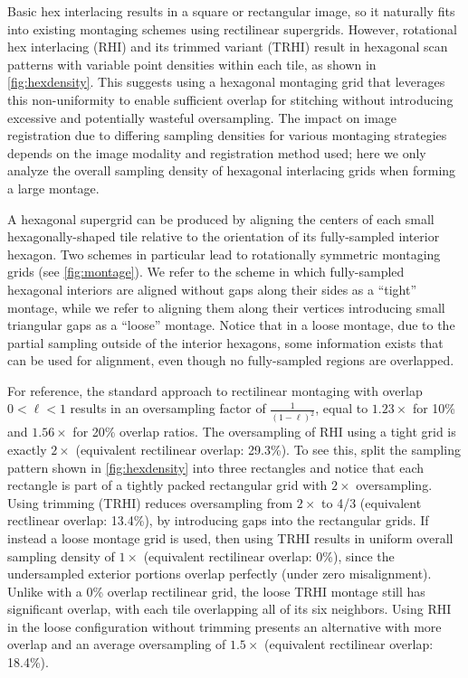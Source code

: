 \documentclass[aip, amsmath, amssymb, nobibnotes, nofootinbib, citeautoscript, reprint, superscriptaddress]{revtex4-1}
\begin{document}
    Basic hex interlacing results in a square or rectangular image, so it naturally
    fits into existing montaging schemes using rectilinear supergrids.
    However, rotational hex interlacing (RHI) and its trimmed variant (TRHI) result in
    hexagonal scan patterns with variable point densities within each tile, as shown
    in \autoref{fig:hexdensity}.
    This suggests using a hexagonal montaging grid that leverages this
    non-uniformity to enable sufficient overlap for stitching without introducing
    excessive and potentially wasteful oversampling.
    The impact on image registration due to differing sampling densities for various
    montaging strategies depends on the image modality and registration method used;
    here we only analyze the overall sampling density of hexagonal interlacing grids
    when forming a large montage.


    A hexagonal supergrid can be produced by aligning the centers of each small
    hexagonally-shaped tile relative to the orientation of its fully-sampled
    interior hexagon.
    Two schemes in particular lead to rotationally symmetric montaging grids (see \autoref{fig:montage}).
    We refer to the scheme in which fully-sampled hexagonal interiors are aligned
    without gaps along their sides as a ``tight'' montage, while we refer to
    aligning them along their vertices introducing small triangular gaps as a
    ``loose'' montage.
    Notice that in a loose montage, due to the partial sampling outside of the
    interior hexagons, some information exists that can be used for alignment, even
    though no fully-sampled regions are overlapped.



    For reference, the standard approach to rectilinear montaging with overlap
    $0<\ell<1$ results in an oversampling factor of $\frac{1}{(1-\ell)^2}$, equal to
    $1.23\times$ for 10\% and $1.56\times$ for 20\% overlap ratios.
    The oversampling of RHI using a tight grid is exactly $2\times$ (equivalent rectilinear
    overlap: 29.3\%).
    To see this, split the sampling pattern shown in \autoref{fig:hexdensity} into three
    rectangles and notice that each rectangle is part of a tightly packed
    rectangular grid with $2\times$ oversampling.
    Using trimming (TRHI) reduces oversampling from $2\times$ to 4/3 (equivalent rectlinear
    overlap: 13.4\%), by introducing gaps into the rectangular grids.
    If instead a loose montage grid is used, then using TRHI results in uniform
    overall sampling density of $1\times$ (equivalent rectilinear overlap: 0\%), since the
    undersampled exterior portions overlap perfectly (under zero misalignment).
    Unlike with a 0\% overlap rectilinear grid, the loose TRHI montage still has
    significant overlap, with each tile overlapping all of its six neighbors.
    Using RHI in the loose configuration without trimming presents an alternative
    with more overlap and an average oversampling of $1.5\times$ (equivalent rectilinear
    overlap: 18.4\%).
\end{document}
